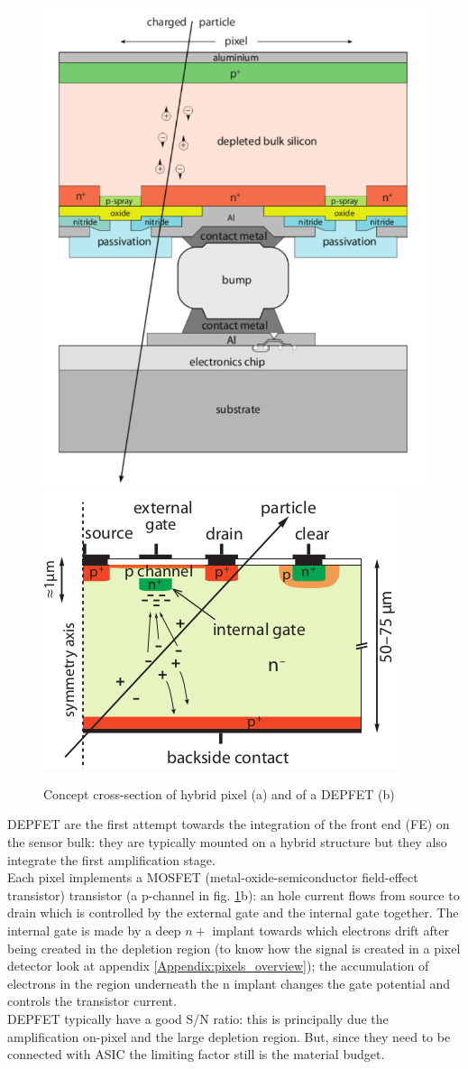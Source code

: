    \begin{figure}
      \centering
      \includegraphics[width=.39\linewidth]{figures/Pixel_detectors/hybrid_scheme.png}
      \includegraphics[width=.49\linewidth]{figures/Pixel_detectors/DEPFET_scheme.png}
      \caption{Concept cross-section of hybrid pixel (a) and of a DEPFET (b)}
      \label{fig:hybrid_DEPFET_scheme}
   \end{figure} 

   DEPFET are the first attempt towards the integration of the front end (FE) on the sensor bulk: they are typically mounted on a hybrid structure but they also integrate the first amplification stage.\\
   Each pixel implements a MOSFET (metal-oxide-semiconductor field-effect transistor) transistor (a p-channel in fig. \ref{fig:hybrid_DEPFET_scheme}b): an hole current flows from source to drain which is controlled by the external gate and the internal gate together. The internal gate is made by a deep $n+$ implant towards which electrons drift after being created in the depletion region (to know how the signal is created in a pixel detector look at appendix \ref{Appendix:pixels_overview}); the accumulation of electrons in the region underneath the n implant changes the gate potential and controls the transistor current.\\
   DEPFET typically have a good S/N ratio: this is principally due the amplification on-pixel and the large depletion region. But, since they need to be connected with ASIC the limiting factor still is the material budget.

